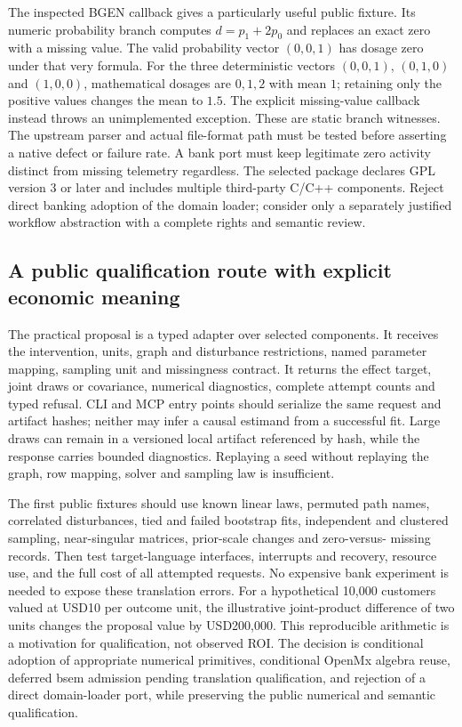 The inspected BGEN callback gives a particularly useful public fixture. Its
numeric probability branch computes $d=p_1+2p_0$ and replaces an exact zero
with a missing value. The valid probability vector $(0,0,1)$ has dosage zero
under that very formula. For the three deterministic vectors $(0,0,1)$,
$(0,1,0)$ and $(1,0,0)$, mathematical dosages are $0,1,2$ with mean $1$;
retaining only the positive values changes the mean to $1.5$. The explicit
missing-value callback instead throws an unimplemented exception. These are
static branch witnesses. The upstream parser and actual file-format path must
be tested before asserting a native defect or failure rate. A bank port must
keep legitimate zero activity distinct from missing telemetry regardless.
The selected package declares GPL version 3 or later and includes multiple
third-party C/C++ components. Reject direct banking adoption of the domain
loader; consider only a separately justified workflow abstraction with a
complete rights and semantic review.~\citep{exec25_cmed_gwsem,exec25_cmed_choice}

\subsection{A public qualification route with explicit economic meaning}

The practical proposal is a typed adapter over selected components. It receives
the intervention, units, graph and disturbance restrictions, named parameter
mapping, sampling unit and missingness contract. It returns the effect target,
joint draws or covariance, numerical diagnostics, complete attempt counts and
typed refusal. CLI and MCP entry points should serialize the same request and
artifact hashes; neither may infer a causal estimand from a successful fit.
Large draws can remain in a versioned local artifact referenced by hash, while
the response carries bounded diagnostics. Replaying a seed without replaying
the graph, row mapping, solver and sampling law is insufficient.

The first public fixtures should use known linear laws, permuted path names,
correlated disturbances, tied and failed bootstrap fits, independent and
clustered sampling, near-singular matrices, prior-scale changes and zero-versus-
missing records. Then test target-language interfaces, interrupts and recovery,
resource use, and the full cost of all attempted requests. No expensive bank
experiment is needed to expose these translation errors. For a hypothetical
10,000 customers valued at USD10 per outcome unit, the illustrative joint-product
difference of two units changes the proposal value by USD200,000. This
reproducible arithmetic is a motivation for qualification, not observed ROI.
The decision is conditional adoption of appropriate numerical primitives,
conditional OpenMx algebra reuse, deferred bsem admission pending translation
qualification, and rejection of a direct domain-loader port, while preserving
the public numerical and semantic qualification.~\citep{exec25_cmed_choice}
